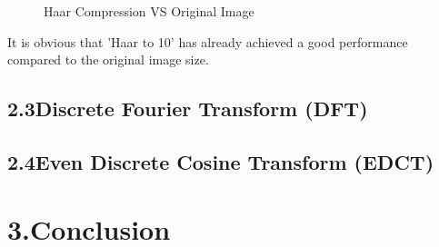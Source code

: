 \documentclass[12pt]{article}
\begin{document}
\begin{figure}[H]
    \centering
    \caption{Haar Compression VS Original Image}
    \label{ref_label_overall}
\end{figure}
\begin{flushleft}
It is obvious that 'Haar to 10' has already achieved a good performance compared to the original image size.
\end{flushleft}
\subsection*{2.3\quad Discrete Fourier Transform (DFT)}


\subsection*{2.4\quad Even Discrete Cosine Transform (EDCT)}




\section*{3.\quad Conclusion}
\end{document}
